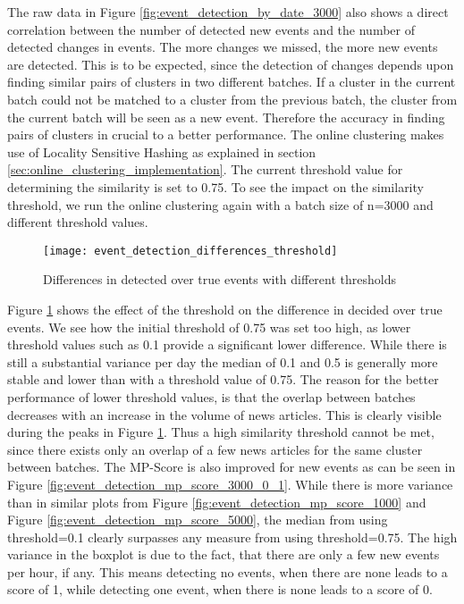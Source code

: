The raw data in Figure \ref{fig:event_detection_by_date_3000} also shows a direct correlation between the number of detected new events and the number of detected changes in events. The more changes we missed, the more new events are detected. This is to be expected, since the detection of changes depends upon finding similar pairs of clusters in two different batches. If a cluster in the current batch could not be matched to a cluster from the previous batch, the cluster from the current batch will be seen as a new event. Therefore the accuracy in finding pairs of clusters in crucial to a better performance. The online clustering makes use of Locality Sensitive Hashing as explained in section \ref{sec:online_clustering_implementation}. The current threshold value for determining the similarity is set to 0.75. To see the impact on the similarity threshold, we run the online clustering again with a batch size of n=3000 and different threshold values.

\begin{figure}[h]
    \centering
    \texttt{[image: event\_detection\_differences\_threshold]}
    \caption{Differences in detected over true events with different thresholds}
    \label{fig:event_detection_differences_threshold}
\end{figure}

Figure \ref{fig:event_detection_differences_threshold} shows the effect of the threshold on the difference in decided over true events. We see how the initial threshold of 0.75 was set too high, as lower threshold values such as 0.1 provide a significant lower difference. While there is still a substantial variance per day the median of 0.1 and 0.5 is generally more stable and lower than with a threshold value of 0.75. The reason for the better performance of lower threshold values, is that the overlap between batches decreases with an increase in the volume of news articles. This is clearly visible during the peaks in Figure \ref{fig:event_detection_differences_threshold}. Thus a high similarity threshold cannot be met, since there exists only an overlap of a few news articles for the same cluster between batches. The MP-Score is also improved for new events as can be seen in Figure \ref{fig:event_detection_mp_score_3000_0_1}. While there is more variance than in similar plots from Figure \ref{fig:event_detection_mp_score_1000} and Figure \ref{fig:event_detection_mp_score_5000}, the median from using threshold=0.1 clearly surpasses any measure from using threshold=0.75. The high variance in the boxplot is due to the fact, that there are only a few new events per hour, if any. This means detecting no events, when there are none leads to a score of 1, while detecting one event, when there is none leads to a score of 0.

